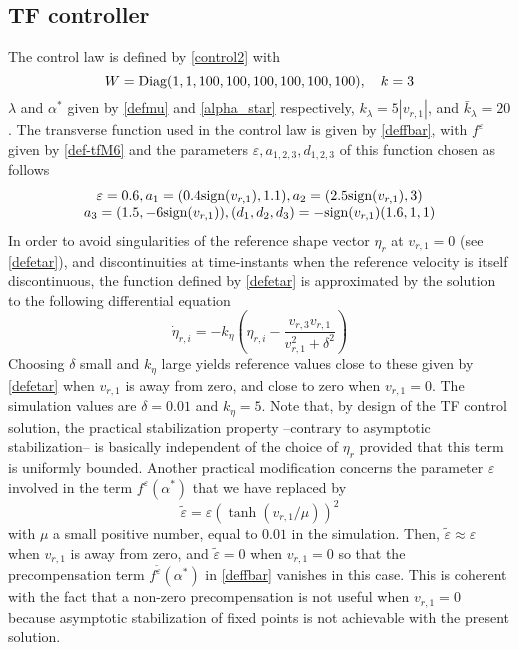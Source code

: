 \documentclass[a4paper,twoside]{article}
\def \eps {\varepsilon}
\newcommand{\tnm}[1]{\textnormal{#1}}
\begin{document}
\subsection{TF controller}
The control law is defined by \eqref{control2} with 
\[
W= \tnm{Diag}(1,1,100,100, 100, 100, 100, 100), \quad k =3
\]
$\lambda$ and $\alpha^*$ given by \eqref{defmu} and \eqref{alpha_star} respectively, $k_\lambda=5 |v_{r,1}|$,
and $\bar k_{\lambda}= 20$. 
The transverse function used in the control law is given by \eqref{deffbar}, with $f^\eps$ given by \eqref{def-tfM6} and the parameters $\eps, a_{1,2,3}, d_{1,2,3}$ of this function chosen as follows
\[
\begin{array}{c}
\eps= 0.6, a_1= (0.4\tnm{sign}(v_{r,1}),1.1), a_2= (2.5\tnm{sign}(v_{r,1}),3) \\
a_3= (1.5,-6 \tnm{sign}(v_{r,1})), (d_1,d_2,d_3)= -\tnm{sign}(v_{r,1})(1.6,1,1)
\end{array}
\]
In order to avoid singularities of the reference shape vector $\eta_r$ at $v_{r,1}=0$ (see \eqref{defetar}), 
and discontinuities at time-instants when the reference velocity is itself discontinuous, the function defined by 
\eqref{defetar} is approximated by the solution to the following differential equation
\[
\dot \eta_{r,i} = - k_\eta \left( \eta_{r,i} - \frac{v_{r,3} v_{r,1}}{v_{r,1}^2+ \delta^2} \right)
\]
Choosing $\delta$ small and $k_\eta$ large yields reference values close to these given by \eqref{defetar} when $v_{r,1}$ is 
away from zero, and close to zero when $v_{r,1}=0$.  The simulation values are 
$\delta= 0.01$ and $k_\eta= 5$. Note that, by design of the TF control solution, the practical stabilization property --contrary to asymptotic stabilization-- is basically independent of the choice of $\eta_r$ provided that this term is uniformly bounded.
Another practical modification concerns the parameter $\eps$ involved in the term $f^\eps(\alpha^*)$ that we have replaced
by
\begin{equation}
\label{teps}
\tilde \eps = \eps (\tanh(v_{r,1}/\mu))^2
\end{equation}
with $\mu$ a small positive number, equal to $0.01$ in the simulation. Then, $\tilde \eps \approx \eps$ when $v_{r,1}$ is away from zero, and  $\tilde \eps=0$ when $v_{r,1}=0$ so that the precompensation term $f^{\tilde \eps}(\alpha^*)$ 
in \eqref{deffbar} vanishes in this case. This is coherent with the fact that a non-zero precompensation is not useful when $v_{r,1}=0$ because 
asymptotic stabilization of fixed points is not achievable with the present solution.
\end{document}
